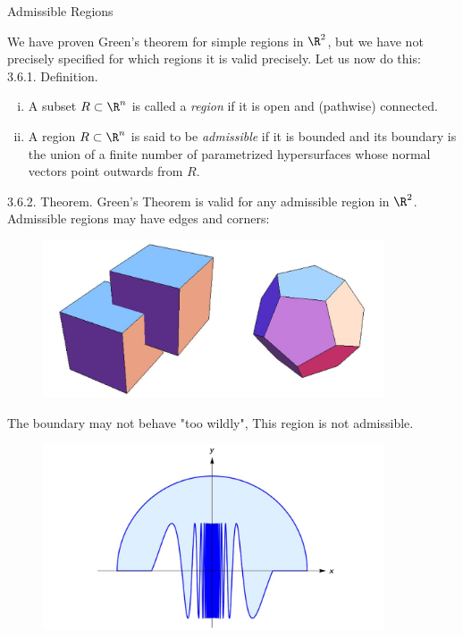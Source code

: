 \documentclass[smaller,hyperref={CJKbookmarks=true}]{beamer}
\begin{document}
\begin{frame}{Admissible Regions}
\begin{spacing}{1.1}
\vspace*{13pt}
We have proven Green's theorem for simple regions in $\R^2$, but we have not
precisely specified for which regions it is valid precisely. Let us now do this:\\[4pt]
\alert{3.6.1. Definition.}
\begin{enumerate}[(i)]
  \item A subset $R\subset\R^n$ is called a \emph{region} if it is open and (pathwise) connected.
  \item A region $R\subset\R^n$ is said to be \emph{admissible} if it is bounded and its
boundary is the union of a finite number of parametrized
hypersurfaces whose normal vectors point outwards from $R$.
\end{enumerate}
\vspace*{7pt}
\alert{3.6.2. Theorem.} Green's Theorem is valid for any admissible region in $\R^2$.
\newpage
Admissible regions may have edges and corners:
\begin{figure}
  \centering
  \includegraphics[width=0.9\textwidth]{75.jpg}

\end{figure}
\newpage
The boundary may not behave "too wildly", This region is not admissible.
\begin{figure}
  \centering
  \includegraphics[width=0.9\textwidth]{76.jpg}


\end{figure}
\end{spacing}
\end{frame}
\end{document}
